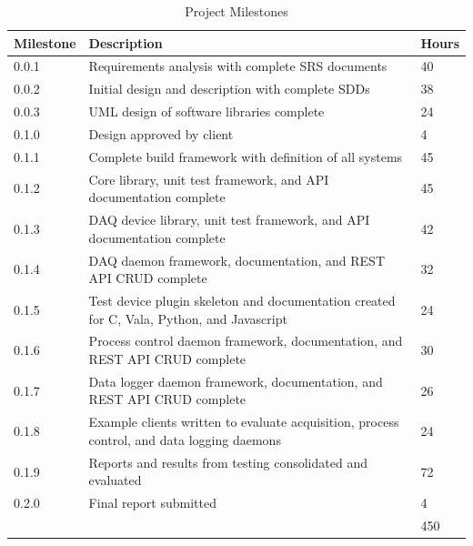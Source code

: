 \documentclass[11pt]{article}
\begin{document}
      \begin{table}[H]
        \centering
        \begin{tabular}{l p{12cm} l}
          \toprule
          Milestone & Description & Hours \\ [0.5ex]
          \midrule
          0.0.1 & Requirements analysis with complete SRS documents & 40 \\
          0.0.2 & Initial design and description with complete SDDs & 38 \\
          0.0.3 & UML design of software libraries complete & 24 \\
          0.1.0 & Design approved by client & 4 \\
          0.1.1 & Complete build framework with definition of all systems & 45 \\
          0.1.2 & Core library, unit test framework, and API documentation complete & 45 \\
          0.1.3 & DAQ device library, unit test framework, and API documentation complete & 42 \\
          0.1.4 & DAQ daemon framework, documentation, and REST API CRUD complete & 32 \\
          0.1.5 & Test device plugin skeleton and documentation created for C, Vala, Python, and Javascript & 24 \\
          0.1.6 & Process control daemon framework, documentation, and REST API CRUD complete & 30 \\
          0.1.7 & Data logger daemon framework, documentation, and REST API CRUD complete & 26 \\
          0.1.8 & Example clients written to evaluate acquisition, process control, and data logging daemons & 24 \\
          0.1.9 & Reports and results from testing consolidated and evaluated & 72 \\
          0.2.0 & Final report submitted & 4 \\
          \midrule
           & & 450 \\
          \bottomrule
        \end{tabular}
        \caption{Project Milestones}\label{tab:milestones}
      \end{table}


  \newpage
  \addappheadtotoc%
  \appendix
  \appendixpage%
\end{document}
